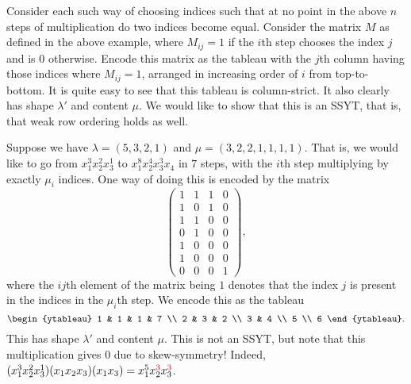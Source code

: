 	Consider each such way of choosing indices such that at no point in the above $n$ steps of multiplication do two indices become equal. Consider the matrix $M$ as defined in the above example, where $M_{ij} = 1$ if the $i$th step chooses the index $j$ and is $0$ otherwise. Encode this matrix as the tableau with the $j$th column having those indices where $M_{ij} = 1$, arranged in increasing order of $i$ from top-to-bottom. It is quite easy to see that this tableau is column-strict. It also clearly has shape $\lambda'$ and content $\mu$. We would like to show that this is an SSYT, that is, that weak row ordering holds as well.

	\begin{fex}
		Suppose we have $\lambda = (5,3,2,1)$ and $\mu = (3,2,2,1,1,1,1)$. That is, we would like to go from $x_1^3x_2^2x_3^1$ to $x_1^8x_2^4x_3^3x_4$ in $7$ steps, with the $i$th step multiplying by exactly $\mu_i$ indices. One way of doing this is encoded by the matrix
		\[ 
		\begin{pmatrix}
		 	1 & 1 & 1 & 0 \\
		 	1 & 0 & 1 & 0 \\
		 	1 & 1 & 0 & 0 \\
		 	0 & 1 & 0 & 0 \\
		 	1 & 0 & 0 & 0 \\
		 	1 & 0 & 0 & 0 \\
		 	0 & 0 & 0 & 1
		\end{pmatrix},
		\]
		where the $ij$th element of the matrix being $1$ denotes that the index $j$ is present in the indices in the $\mu_i$th step.
		We encode this as the tableau
		\[ \begin{ytableau} 1 & 1 & 1 & 7 \\ 2 & 3 & 2 \\ 3 & 4 \\ 5 \\ 6 \end{ytableau}. \]
		This has shape $\lambda'$ and content $\mu$. This is not an SSYT, but note that this multiplication gives $0$ due to skew-symmetry! Indeed, $(x_1^3x_2^2x_3^1)(x_1x_2x_3)(x_1x_3) = x_1^5x_2^{\textcolor{red}{3}}x_3^{\textcolor{red}{3}}$.


\end{fex}
